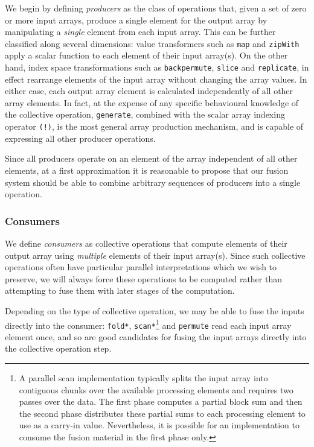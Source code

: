 We begin by defining \emph{producers} as the class of operations
that, given a set of zero or more input arrays, produce a single element for the
output array by manipulating a \emph{single} element from each input array. This
can be further classified along several dimensions: value transformers such as
\texttt{map} and \texttt{zipWith} apply a scalar function to each element of
their input array(s). On the other hand, index space transformations such as
\texttt{backpermute}, \texttt{slice} and \texttt{replicate}, in effect rearrange
elements of the input array without changing the array values. In either case,
each output array element is calculated independently of all other array
elements. In fact, at the expense of any specific behavioural knowledge of the
collective operation, \texttt{generate}, combined with the scalar array
indexing operator \texttt{(!)}, is the most general array production mechanism,
and is capable of expressing all other producer operations.

Since all producers operate on an element of the array independent of all other
elements, at a first approximation it is reasonable to propose that our fusion
system should be able to combine arbitrary sequences of producers into a single
operation.


\subsubsection{Consumers}

We define \emph{consumers} as collective operations that compute
elements of their output array using \emph{multiple} elements of their input
array(s). Since such collective operations often have particular parallel
interpretations which we wish to preserve, we will always force these operations
to be computed rather than attempting to fuse them with later stages of the
computation.

Depending on the type of collective operation, we may be able to fuse the inputs
directly into the consumer: \texttt{fold*}, \texttt{scan*}\footnote{A parallel
scan implementation typically splits the input array into contiguous chunks over
the available processing elements and requires two passes over the data. The
first phase computes a partial block sum and then the second phase distributes
these partial sums to each processing element to use as a carry-in value.
Nevertheless, it is possible for an implementation to consume the fusion
material in the first phase only.} and \texttt{permute} read each input array
element once, and so are good candidates for fusing the input arrays directly
into the collective operation step.

